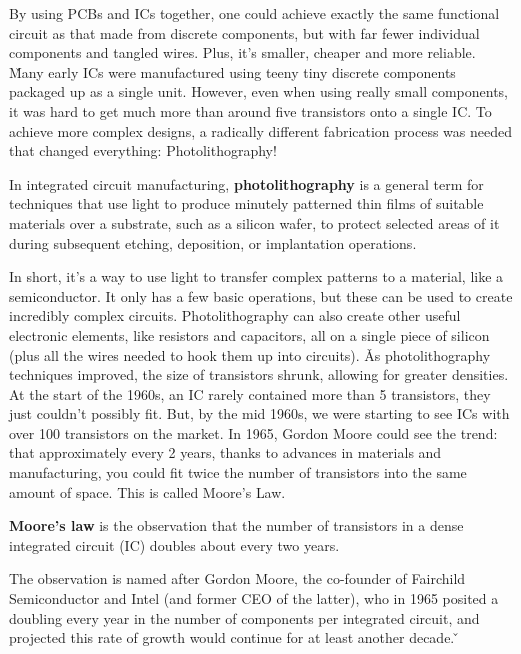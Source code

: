 
By using PCBs and ICs together, one could achieve exactly the same functional circuit as that made from discrete
components, but with far fewer individual components and tangled wires. Plus, it's smaller, cheaper and more reliable. \v

Many early ICs were manufactured using teeny tiny discrete components packaged up as a single unit. However, even
when using really small components, it was hard to get much more than around five transistors onto a single IC. To
achieve more complex designs, a radically different fabrication process was needed that changed everything:
Photolithography!

\bd[Photolithography]
In integrated circuit manufacturing, \textbf{photolithography} is a general term for techniques that use light to
produce minutely patterned thin films of suitable materials over a substrate, such as a silicon wafer, to protect
selected areas of it during subsequent etching, deposition, or implantation operations.
\ed

In short, it's a way to use light to transfer complex patterns to a material, like a semiconductor. It only has a few
basic operations, but these can be used to create incredibly complex circuits. Photolithography can also create other
useful electronic elements, like resistors and capacitors, all on a single piece of silicon (plus all the wires
needed to hook them up into circuits). \v

As photolithography techniques improved, the size of transistors shrunk, allowing for greater densities. At the start
of the 1960s, an IC rarely contained more than 5 transistors, they just couldn't possibly fit. But, by the mid 1960s,
we were starting to see ICs with over 100 transistors on the market. In 1965, Gordon Moore could see the trend: that
approximately every 2 years, thanks to advances in materials and manufacturing, you could fit twice the number of
transistors into the same amount of space. This is called Moore's Law.

\textbf{Moore's law} is the observation that the number of transistors in a dense integrated circuit (IC) doubles about
every two years.
\ed

The observation is named after Gordon Moore, the co-founder of Fairchild Semiconductor and Intel (and former CEO of
the latter), who in 1965 posited a doubling every year in the number of components per integrated circuit, and
projected this rate of growth would continue for at least another decade. \v

